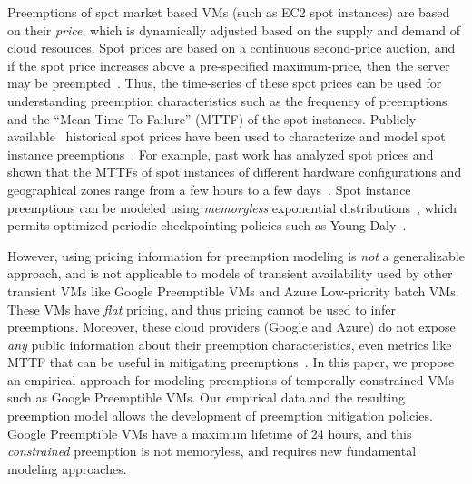 Preemptions of spot market based VMs (such as EC2 spot instances) are based on their \emph{price}, which is dynamically adjusted based on the supply and demand of cloud resources. 
Spot prices are based on a continuous second-price auction, and if the spot price increases above a pre-specified maximum-price, then the server may be preempted~\cite{spot-pricing2}. 
%
Thus, the time-series of these spot prices can be used for understanding preemption characteristics such as the frequency of preemptions and the ``Mean Time To Failure'' (MTTF) of the spot instances. 
Publicly available~\cite{bidding4} historical spot prices have been used to characterize and model spot instance preemptions~\cite{spotcheck, bid-cloud, transient-guarantees, wolski2016providing}. %
For example, past work has analyzed spot prices and shown that the MTTFs of spot instances of different hardware configurations and geographical zones range from a few hours to a few days~\cite{wolski_probabilistic_2017, icdcs-spotlight, wolski2016providing, baughman2018predicting, wolski2017probabilistic}.
%
Spot instance preemptions can be modeled using \emph{memoryless}  exponential distributions~\cite{bid-cloud, hotcloud-not-bid, flint, ghit-spark-hpdc, chien-ic2e19}, which permits optimized periodic checkpointing policies such as Young-Daly~\cite{daly2006higher}. 



However, using pricing information for preemption modeling is \emph{not} a generalizable approach, and is not applicable to models of transient availability used by other transient VMs like Google Preemptible VMs and Azure Low-priority batch VMs. 
%
These VMs have \emph{flat} pricing, and thus pricing cannot be used to infer preemptions. 
%
Moreover, these cloud providers (Google and Azure) do not expose \emph{any} public information about their preemption characteristics, even metrics like MTTF that can be useful in mitigating preemptions~\cite{chien-ic2e19}. 
%
%
In this paper, we propose an empirical approach for modeling preemptions of temporally constrained VMs such as Google Preemptible VMs.
%
Our empirical data and the resulting preemption model allows the development of preemption mitigation policies. 
%
Google Preemptible VMs have a maximum lifetime of 24 hours, and this \emph{constrained} preemption is not memoryless, and requires new fundamental modeling approaches. 




